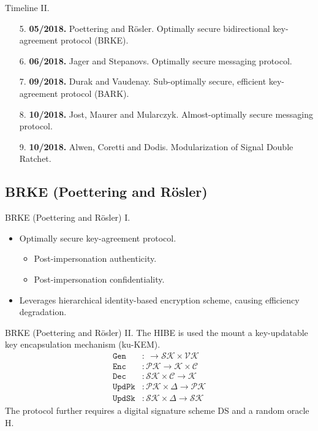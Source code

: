 \documentclass{beamer}
\begin{document}
\begin{frame}{Timeline II.}
  \begin{enumerate}
  \item[5.] \textbf{05/2018.} Poettering and Rösler. Optimally secure bidirectional
    key-agreement protocol (BRKE).
  \item[6.] \textbf{06/2018.} Jager and Stepanovs. Optimally secure messaging protocol.
  \item[7.] \textbf{09/2018.} Durak and Vaudenay. Sub-optimally secure, efficient key-agreement
    protocol (BARK).
  \item[8.] \textbf{10/2018.} Jost, Maurer and Mularczyk. Almost-optimally secure messaging
    protocol.
  \item[9.] \textbf{10/2018.} Alwen, Coretti and Dodis. Modularization of Signal Double
    Ratchet.
  \end{enumerate}
\end{frame}

\subsection{BRKE (Poettering and Rösler)}
\label{sec:brke-poett-rosl}

\begin{frame}{BRKE (Poettering and Rösler) I.}
  \begin{itemize}
  \item Optimally secure key-agreement protocol.
    \begin{itemize}
    \item Post-impersonation authenticity.
    \item Post-impersonation confidentiality.
    \end{itemize}
  \item Leverages hierarchical identity-based encryption scheme,
    causing efficiency degradation.
  \end{itemize}
\end{frame}

\begin{frame}{BRKE (Poettering and Rösler) II.}
  The HIBE is used the mount a key-updatable key encapsulation mechanism (ku-KEM).
  \begin{align*}
    \texttt{Gen} & : \ \rightarrow \mathcal{SK} \times \mathcal{VK} \\
    \texttt{Enc} & : \mathcal{PK} \rightarrow \mathcal{K} \times \mathcal{C} \\ 
    \texttt{Dec} & : \mathcal{SK} \times \mathcal{C} \rightarrow \mathcal{K} \\
    \texttt{UpdPk} & : \mathcal{PK} \times \Delta \rightarrow \mathcal{PK} \\
    \texttt{UpdSk} & : \mathcal{SK} \times \Delta \rightarrow \mathcal{SK}
  \end{align*}
  The protocol further requires a digital signature scheme DS and a random
  oracle H.
\end{frame}
\end{document}
